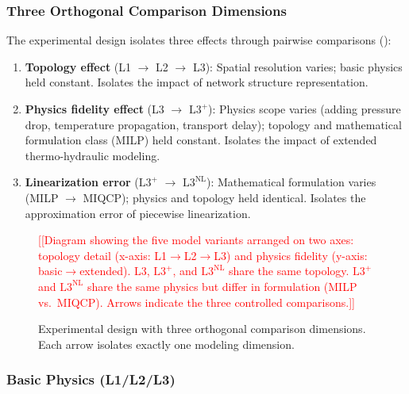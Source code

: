 \documentclass[review,3p]{elsarticle}
\newcommand{\placeholder}[1]{\textcolor{red}{[#1]}}
\newcommand{\Lplus}{\mathrm{L3}^{+}}
\newcommand{\Lnl}{\mathrm{L3}^{\mathrm{NL}}}
\begin{document}
\subsubsection{Three Orthogonal Comparison Dimensions}

The experimental design isolates three effects through pairwise
comparisons ():

\begin{enumerate}[nosep]
    \item \textbf{Topology effect} (L1 $\to$ L2 $\to$ L3): Spatial
    resolution varies; basic physics held constant. Isolates the
    impact of network structure representation.
    \item \textbf{Physics fidelity effect} (L3 $\to$ $\Lplus$):
    Physics scope varies (adding pressure drop, temperature
    propagation, transport delay); topology and mathematical
    formulation class (MILP) held constant. Isolates the impact
    of extended thermo-hydraulic modeling.
    \item \textbf{Linearization error} ($\Lplus$ $\to$ $\Lnl$):
    Mathematical formulation varies (MILP $\to$ MIQCP); physics
    and topology held identical. Isolates the approximation error
    of piecewise linearization.
\end{enumerate}

\begin{figure}[htbp]
\centering
\placeholder{[Diagram showing the five model variants arranged on
two axes: topology detail (x-axis: L1$\to$L2$\to$L3) and physics
fidelity (y-axis: basic$\to$extended). L3, $\Lplus$, and $\Lnl$
share the same topology. $\Lplus$ and $\Lnl$ share the same
physics but differ in formulation (MILP vs.\ MIQCP). Arrows
indicate the three controlled comparisons.]}
\caption{Experimental design with three orthogonal comparison
dimensions. Each arrow isolates exactly one modeling dimension.}
\label{fig:comparison_design}
\end{figure}

\subsubsection{Basic Physics (L1/L2/L3)}
\end{document}
